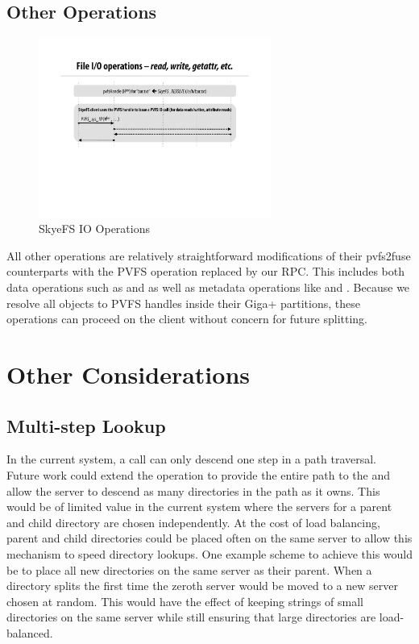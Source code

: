 \documentclass[onecolumn, 11pt, letterpaper]{article}
\begin{document}
\subsection{Other Operations}
\begin{figure}
\begin{center}
\includegraphics[width=3in]{figure-other}
\end{center}
\caption{SkyeFS IO Operations}
\end{figure}
All other operations are relatively straightforward modifications of their
pvfs2\-fuse counterparts with the PVFS  operation replaced by our
RPC.  This includes both data operations such as  and 
as well as metadata operations like  and .  Because we
resolve all objects to PVFS handles inside their Giga+ partitions, these
operations can proceed on the client without concern for future splitting.

\section{Other Considerations}
\subsection{Multi-step Lookup}
In the current system, a  call can only descend one step in a path
traversal.  Future work could extend the operation to provide the entire path
to the  and allow the server to descend as many
directories in the path as it owns.  This would be of limited value in the
current system where the servers for a parent and child directory are chosen
independently.  At the cost of load balancing, parent and child directories
could be placed often on the same server to allow this mechanism to speed
directory lookups.  One example scheme to achieve this would be to place all
new directories on the same server as their parent.  When a directory splits
the first time the zeroth server would be moved to a new server chosen at
random.  This would have the effect of keeping strings of small 
directories on the same server while still ensuring that large
directories are load-balanced.
\end{document}
